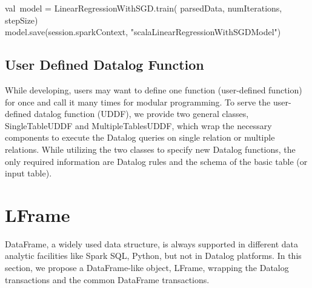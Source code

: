 val\ model = LinearRegressionWithSGD.train(
parsedData,
numIterations,
stepSize)\\

model.save(session.sparkContext, "scalaLinearRegressionWithSGDModel")\\


\eldl




\subsection{User Defined Datalog Function}
While developing, users may want to define one function (user-defined function) for once and call it many times for modular programming. To serve the user-defined datalog function (UDDF), we provide two general classes, SingleTableUDDF and MultipleTablesUDDF, which wrap the necessary components to execute the Datalog queries on single relation or multiple relations.  %
While utilizing the two classes to specify new Datalog functions, the only required information are Datalog rules and the schema of the basic table (or input table). 

\section{LFrame}
\label{lframe}
DataFrame, a widely used data structure, is always supported in different data analytic facilities like Spark SQL, Python, but not in Datalog platforms. In this section, we propose a DataFrame-like object, LFrame, wrapping the Datalog transactions and the common DataFrame transactions.

